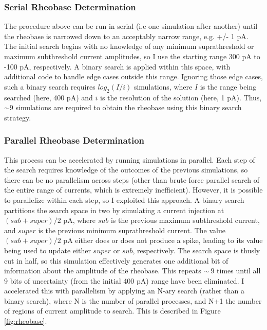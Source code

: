 \subsubsection{Serial Rheobase Determination}
The procedure above can be run in serial (i.e one simulation after another) until the rheobase is narrowed down to an acceptably narrow range, e.g. +/- 1 pA.
The initial search begins with no knowledge of any minimum suprathreshold or maximum subthreshold current amplitudes, so I use the starting range 300 pA to -100 pA, respectively.
A binary search is applied within this space, with additional code to handle edge cases outside this range.
Ignoring those edge cases, such a binary search requires $log_2(I/i)$ simulations, where $I$ is the range being searched (here, 400 pA) and $i$ is the resolution of the solution (here, 1 pA).
Thus, $\sim9$ simulations are required to obtain the rheobase using this binary search strategy.

\subsubsection{Parallel Rheobase Determination}
This process can be accelerated by running simulations in parallel.
Each step of the search requires knowledge of the outcomes of the previous simulations, so there can be no parallelism across steps (other than brute force parallel search of the entire range of currents, which is extremely inefficient).
However, it is possible to parallelize within each step, so I exploited this approach.
A binary search partitions the search space in two by simulating a current injection at $(sub+super)/2$ pA, where $sub$ is the previous maximum subthreshold current, and $super$ is the previous minimum suprathreshold current.
The value $(sub+super)/2$ pA either does or does not produce a spike, leading to its value being used to update either $super$ or $sub$, respectively.
The search space is thusly cut in half, so this simulation effectively generates one additional bit of information about the amplitude of the rheobase.
This repeats $\sim~9$ times until all 9 bits of uncertainty (from the initial 400 pA) range have been eliminated.
I accelerated this with parallelism by applying an N-ary search (rather than a binary search), where N is the number of parallel processes, and N+1 the number of regions of current amplitude to search.
This is described in Figure \ref{fig:rheobase}.


